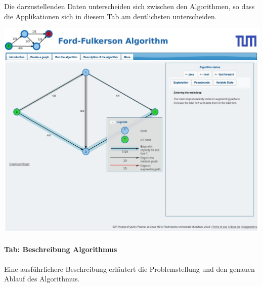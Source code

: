 Die darzustellenden Daten unterscheiden sich zwischen den Algorithmen, so dass die Applikationen sich in diesem Tab am deutlichsten unterscheiden.

\begin{center}
\begin{minipage}[t]{0.60\textwidth}
    \includegraphics[width=\textwidth]{img/layout-3.jpg}
\end{minipage}
\end{center}
\vspace{0.7cm}

\paragraph{Tab: Beschreibung Algorithmus}

Eine ausführlichere Beschreibung erläutert die Problemstellung und den genauen Ablauf des Algorithmus.

